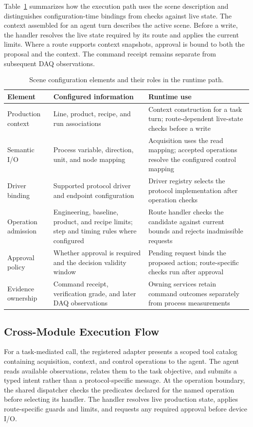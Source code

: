 Table~\ref{tab:scene-config} summarizes how the execution path uses the scene
description and distinguishes configuration-time bindings from checks against
live state. The context assembled for an agent turn describes the active scene. Before a
write, the handler resolves the live state required by its route and applies
the current limits. Where a route supports context snapshots, approval is
bound to both the proposal and the context. The command receipt remains
separate from subsequent DAQ observations.

\begin{table}[!t]
\centering
\caption{Scene configuration elements and their roles in the runtime path.}
\label{tab:scene-config}
\footnotesize
\setlength{\tabcolsep}{5pt}
\begin{tabularx}{\textwidth}{@{}>{\raggedright\arraybackslash}p{}>{\raggedright\arraybackslash}p{}X@{}}
\toprule
Element & Configured information & Runtime use\\
\midrule
Production context & Line, product, recipe, and run associations & Context construction for a task turn; route-dependent live-state checks before a write\\
Semantic I/O & Process variable, direction, unit, and node mapping & Acquisition uses the read mapping; accepted operations resolve the configured control mapping\\
Driver binding & Supported protocol driver and endpoint configuration & Driver registry selects the protocol implementation after operation checks\\
Operation admission & Engineering, baseline, product, and recipe limits; step and timing rules where configured & Route handler checks the candidate against current bounds and rejects inadmissible requests\\
Approval policy & Whether approval is required and the decision validity window & Pending request binds the proposed action; route-specific checks run after approval\\
Evidence ownership & Command receipt, verification grade, and later DAQ observations & Owning services retain command outcomes separately from process measurements\\
\bottomrule
\end{tabularx}
\end{table}

\subsection{Cross-Module Execution Flow}
\label{sec:executionflow}
For a task-mediated call, the registered adapter presents a scoped tool
catalog containing acquisition, context, and control operations to the agent.
The agent reads available observations, relates them to the task objective, and
submits a typed intent rather than a protocol-specific message. At the
operation boundary, the shared dispatcher checks the predicates declared for
the named operation before selecting its handler. The handler resolves live
production state, applies route-specific guards and limits, and requests any
required approval before device I/O.

